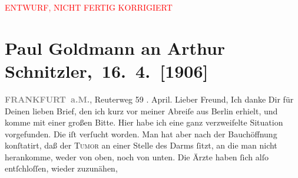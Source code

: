 
\begin{center}
            \textcolor{red}{ENTWURF, NICHT FERTIG KORRIGIERT}
                      \end{center}
            
         
         \renewcommand{\erwaehntePersonen}{Personen: Paul Kraske, Fedor Mamroth, Josef Rosengart, Julius Schnitzler}
         \renewcommand{\erwaehnteOrte}{Orte: Berlin, Frankfurt am Main, Freiburg im Breisgau, Reuterweg, Wien}
         \renewcommand{\erwaehnteWerke}{}
               \section[ Paul Goldmann an Arthur Schnitzler, 16. 4. {[}1906{]}]{ Paul Goldmann an Arthur Schnitzler, 16. 4. {[}1906{]}}\nopagebreak{}\rehead{ }\begin{ledgroupsized}[t]{13cm}\normalsize\beginnumbering \toendnotes[C]{\smallbreak\pagebreak[2]} 
\toendnotes[C]{\smallbreak}\pstart
           \noindent{}\raggedleft{}{\pb}\textcolor{gray}{\textbf{FRANKFURT a.M.}}, Reuterweg 59\pend
           . April.\pend
           \pstart
           Lieber Freund, Ich danke Dir für Deinen lieben Brief,
               den ich kurz vor meiner Abreiſe aus Berlin
               erhielt, und komme mit einer großen Bitte.\pend
           \pstart
           Hier habe ich eine ganz
               verzweifelte Situation vorgefunden. Die \label{K-L03243-1v}\label{K-L03243-1h} iſt verſucht
               worden. Man hat aber nach der Bauchöffnung konſtatirt, daß der \textsc{Tumor} an einer Stelle des Darms ſitzt, an die man nicht herankomme, weder
               von oben, noch von unten. Die Ärzte haben ſich alſo entſchloſſen, wieder zuzunähen,

\end{ledgroupsized}
